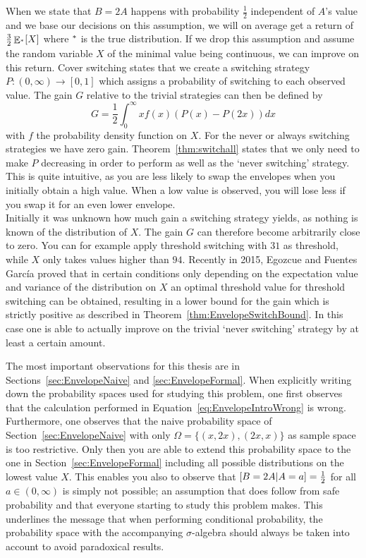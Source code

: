 \documentclass[a4paper]{report}
\theoremstyle{plain}
\theoremstyle{definition}
\theoremstyle{remark}
\numberwithin{equation}{chapter}
\let\P\relax
\DeclareMathOperator{\P}{\mathbb{P}}
\DeclareMathOperator{\E}{\mathbb{E}}
\DeclareMathOperator{\1}{\mathbbm{1}}
\begin{document}
When we state that $B=2A$ happens with probability $\frac{1}{2}$ independent of $A$'s value and we base our decisions on this assumption, we will on average get a return of $\frac{3}{2}\E_{\P^*}[X]$ where $\P^*$ is the true distribution. If we drop this assumption and assume the random variable $X$ of the minimal value being continuous, we can improve on this return. Cover switching states that we create a switching strategy $P\colon(0,\infty)\to[0,1]$ which assigns a probability of switching to each observed value. The gain $G$ relative to the trivial strategies can then be defined by
\begin{equation}
G=\frac{1}{2}\int_0^\infty xf(x)(P(x)-P(2x))dx
\end{equation}
with $f$ the probability density function on $X$. For the never or always switching strategies we have zero gain. Theorem~\ref{thm:switchall} states that we only need to make $P$ decreasing in order to perform as well as the `never switching' strategy. This is quite intuitive, as you are less likely to swap the envelopes when you initially obtain a high value. When a low value is observed, you will lose less if you swap it for an even lower envelope.\\
Initially it was unknown how much gain a switching strategy yields, as nothing is known of the distribution of $X$. The gain $G$ can therefore become arbitrarily close to zero. You can for example apply threshold switching with $31$ as threshold, while $X$ only takes values higher than $94$. Recently in 2015, Egozcue and Fuentes García \cite{Egozcue15} proved that in certain conditions only depending on the expectation value and variance of the distribution on $X$ an optimal threshold value for threshold switching can be obtained, resulting in a lower bound for the gain which is strictly positive as described in Theorem~\ref{thm:EnvelopeSwitchBound}. In this case one is able to actually improve on the trivial `never switching' strategy by at least a certain amount.

The most important observations for this thesis are in Sections~\ref{sec:EnvelopeNaive} and \ref{sec:EnvelopeFormal}. When explicitly writing down the probability spaces used for studying this problem, one first observes that the calculation performed in Equation~\ref{eq:EnvelopeIntroWrong} is wrong. Furthermore, one observes that the naive probability space of Section~\ref{sec:EnvelopeNaive} with only $\Omega=\{(x,2x),(2x,x)\}$ as sample space is too restrictive. Only then you are able to extend this probability space to the one in Section~\ref{sec:EnvelopeFormal} including all possible distributions on the lowest value $X$. This enables you also to observe that $\P[B=2A|A=a]=\frac{1}{2}$ for all $a\in(0,\infty)$ is simply not possible; an assumption that does follow from safe probability and that everyone starting to study this problem makes. This underlines the message that when performing conditional probability, the probability space with the accompanying $\sigma$-algebra should always be taken into account to avoid paradoxical results.
\end{document}
